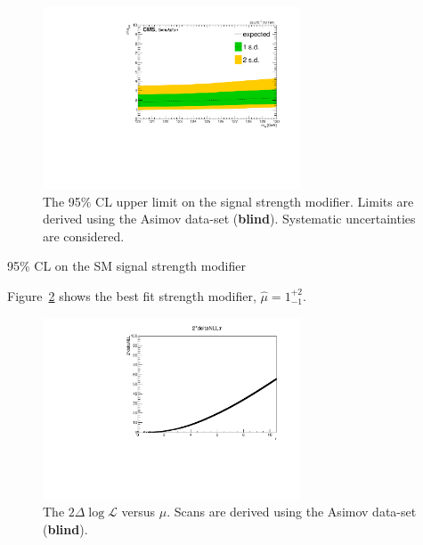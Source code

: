 \begin{figure}[h!]
    \centering
    \includegraphics[width=0.681\textwidth]{figures/results/limit}
    \caption{The 95\% CL upper limit on the signal strength modifier. Limits
are derived using the Asimov data-set ({\bf blind}). Systematic uncertainties
are considered.}
    \label{results:limit}
\end{figure}


\begin{table}[h!]
    \centering
    \caption{95\% CL on the SM signal strength modifier}
    
\end{table}

Figure~\ref{results:mu} shows the best fit strength modifier,
$\hat{\mu}=1^{+2}_{-1}$.
\begin{figure}[h!]
    \centering
    \includegraphics[width=0.681\textwidth]{figures/results/mu}
    \caption{The $2\Delta\log{\mathcal{L}}$ versus $\mu$. Scans are derived using the Asimov data-set ({\bf blind}).}
    \label{results:mu}
\end{figure}

